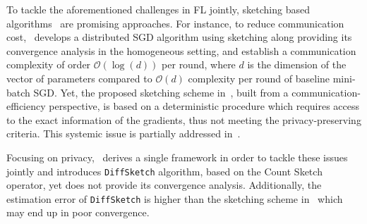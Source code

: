 \documentclass{article} %
\begin{document}
To tackle the aforementioned challenges in FL jointly, sketching based algorithms~\citep{DBLP:journals/tcs/CharikarCF04,cormode2005improved,kleinberg2003bursty,Proc:Li_Church_Hastie_NIPS08} 
are promising approaches. 
For instance, to reduce communication cost,~\citep{ivkin2019communication} develops a distributed SGD algorithm using sketching along providing its convergence analysis in the homogeneous setting, and establish a communication complexity of order $\mathcal{O}(\log(d))$ per round, where $d$ is the dimension of the vector of parameters compared to $\mathcal{O}(d)$ complexity per round of baseline mini-batch SGD. Yet, the proposed sketching scheme in~\cite{ivkin2019communication}, built from a communication-efficiency perspective, is based on a deterministic procedure which requires access to the exact information of the gradients, thus not meeting the  privacy-preserving criteria.
This systemic issue is partially addressed in~\cite{rothchild2020fetchsgd}. 


Focusing on privacy,~\citep{li2019privacy} derives a single framework in order to tackle these issues jointly and introduces \texttt{DiffSketch} algorithm, based on the Count Sketch operator, yet does not provide its convergence analysis.
Additionally, the estimation error of \texttt{DiffSketch} is higher than the sketching scheme in~\cite{ivkin2019communication} which may end up in poor convergence. 
 
\end{document}
